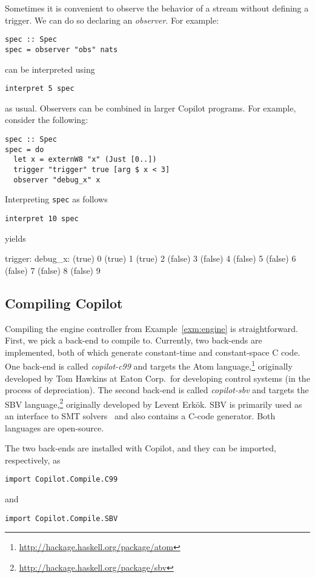 Sometimes it is convenient to observe the behavior of a stream without defining
a trigger. We can do so declaring an \emph{observer}. For example:
%
\begin{lstlisting}[language = Copilot]
spec :: Spec
spec = observer "obs" nats
\end{lstlisting}
%
can be interpreted using
%
\begin{lstlisting}[language = Copilot]
interpret 5 spec
\end{lstlisting}
%
as usual. Observers can be combined in larger Copilot programs. For example,
consider the following:
%
\begin{lstlisting}[language = Copilot]
spec :: Spec
spec = do
  let x = externW8 "x" (Just [0..])
  trigger "trigger" true [arg $ x < 3]
  observer "debug_x" x
\end{lstlisting}
Interpreting {\tt spec} as follows
%
\begin{lstlisting}[language = Copilot]
interpret 10 spec
\end{lstlisting}
%
yields
%
\begin{code}
trigger:  debug_x:
(true)    0
(true)    1
(true)    2
(false)   3
(false)   4
(false)   5
(false)   6
(false)   7
(false)   8
(false)   9
\end{code}

\subsection{Compiling Copilot} \label{sec:compiling}

Compiling the engine controller from Example~\ref{exm:engine} is
straightforward. First, we pick a back-end to compile to. Currently, two
back-ends are implemented, both of which generate constant-time and
constant-space C code. One back-end is called \emph{copilot-c99} and targets
the Atom language,\footnote{\url{http://hackage.haskell.org/package/atom}}
originally developed by Tom Hawkins at Eaton Corp.\ for developing control
systems (in the process of depreciation). The second back-end is called \emph{copilot-sbv} and targets the SBV
language,\footnote{\url{http://hackage.haskell.org/package/sbv}} originally
developed by Levent Erk\"{o}k. SBV is primarily used as an interface to SMT
solvers~\cite{smt} and also contains a C-code generator. Both languages are
open-source.

The two back-ends are installed with Copilot, and they can be imported,
respectively, as

\begin{lstlisting}[language = Copilot]
import Copilot.Compile.C99
\end{lstlisting}
\noindent
and
\begin{lstlisting}[language = Copilot]
import Copilot.Compile.SBV
\end{lstlisting}

